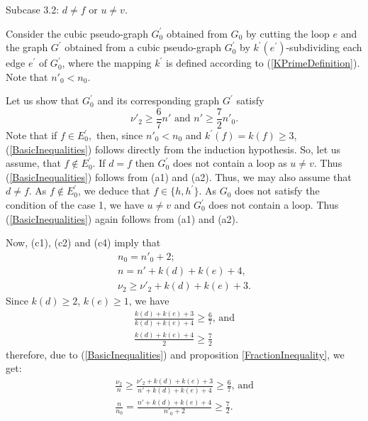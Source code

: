 \documentclass[fleqn,12pt,twoside]{article}
\newenvironment{proof}[1][Proof.]{\begin{trivlist}
\item[\hskip \labelsep {\bfseries #1}]}{\end{trivlist}}
\begin{document}
\begin{proof}
Subcase 3.2: $d\neq f$ or $u\neq v$.

Consider the cubic pseudo-graph $G_{0}^{\prime }$ obtained from
$G_{0}$ by cutting the loop $e$ and the graph $G^{\prime }$ obtained
from a cubic pseudo-graph $G_{0}^{\prime }$ by $k^{\prime
}(e^{\prime })$-subdividing each edge $e^{\prime }$ of
$G_{0}^{\prime }$, where the mapping $k^{\prime }$ is defined
according to (\ref{KPrimeDefinition}). Note that $n'_0 <n_0$.

Let us show that $G_{0}^{\prime }$ and its corresponding graph
$G^{\prime }$ satisfy
\begin{equation}
\nu' _{2}\geq \frac{6}{7}n' \text{ and }n'\geq \frac{7}{2}n'_0.
\label{BasicInequalities}
\end{equation}Note that if $f\in E_{0}^{\prime },$ then, since $n'_0 < n_0$ and $k^{\prime }(f)=k(f)\geq 3$, (\ref{BasicInequalities}) follows
directly from the induction hypothesis. So, let us assume, that
$f\notin E_{0}^{\prime }$. If $d=f$ then $G_{0}^{\prime }$ does not
contain a loop as $u\neq v$. Thus (\ref{BasicInequalities}) follows
from (a1) and (a2). Thus, we may also assume that $d\neq f$. As
$f\notin E_{0}^{\prime }$, we deduce that $f\in \{h,h^{\prime }\}$.
As $G_{0}$ does not satisfy the condition of the case 1, we have
$u\neq v$ and $G_{0}^{\prime }$ does not contain a loop. Thus
(\ref{BasicInequalities}) again follows from (a1) and (a2).

Now, (c1), (c2) and (c4) imply that\begin{gather*}
n_0=n'_0+2;
\\
n =n'+k(d)+k(e)+4\text{,} \\
\nu _{2}\geq \nu' _{2}+k(d)+k(e)+3.
\end{gather*}Since $k(d)\geq 2$, $k(e)\geq 1$, we have
\begin{gather*}
\frac{k(d)+k(e)+3}{k(d)+k(e)+4}\geq \frac{6}{7}\text{, and} \\
\frac{k(d)+k(e)+4}{2}\geq \frac{7}{2}
\end{gather*}therefore, due to (\ref{BasicInequalities}) and proposition \ref {FractionInequality}, we get:
\begin{gather*}
\frac{\nu _{2}}{n}\geq \frac{\nu' _{2}+k(d)+k(e)+3}{n'+k(d)+k(e)+4}\geq \frac{6}{7}\text{, and} \\
\frac{n }{n_0}=\frac{n'+k(d)+k(e)+4}{n'_0+2}\geq \frac{7}{2}.
\end{gather*}


\end{proof}
\end{document}
